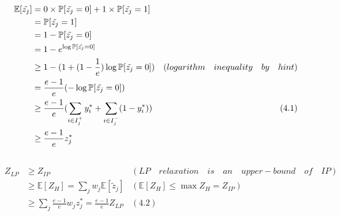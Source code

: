 \documentclass{article}
\begin{document}
\begin{align*}
    \mathbb{E}[\Tilde{z_j}] & = 0 \times \mathbb{P}[\Tilde{z_j} = 0] + 1 \times \mathbb{P}[\Tilde{z_j} = 1] &\\
    & = \mathbb{P}[\Tilde{z_j} = 1] &\\
    & = 1 - \mathbb{P}[\Tilde{z_j} = 0] &\\
    & =  1 - e^{\log \mathbb{P}[\Tilde{z_j} = 0]} &\\
    & \geq  1 - ({ 1 + (1-\frac{1}{e})\log  \mathbb{P}[\Tilde{z_j} = 0]}) &(logarithm \quad inequality \quad by \quad hint)\\
    & = \frac{e-1}{e}(-\log \mathbb{P}[\Tilde{z_j} = 0])&\\
    & \geq \frac{e-1}{e}( \sum_{i \in I^{+}_{j}}y^{*}_i + \sum_{i \in I^{-}_{j}}(1-y^{*}_i))& (4.1)\\
    & \geq \frac{e-1}{e} z^{*}_{j}
\end{align*}

\subsection{}

\begin{align*}
    Z_{LP} & \geq Z_{IP} & (LP \quad relaxation \quad is \quad an \quad upper-bound \quad of \quad IP)\\
    & \geq \mathbb{E}[Z_H]=\sum_j w_j \mathbb E[\tilde z_{j}] & (\mathbb{E}[Z_H] \leq \max Z_H = Z_{IP})\\
    & \geq \sum_j\frac{e-1}{e} w_jz^{*}_{j} =  \frac{e-1}{e} Z_{LP} & (4.2)\\
\end{align*}
\end{document}
